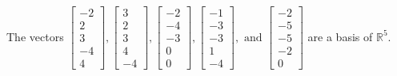 \begin{exercise}
\begin{exerciseStatement}
  \end{exerciseStatement}
  \begin{exerciseAnswer}
   The vectors \(\left[\begin{array}{r}
-2 \\
2 \\
3 \\
-4 \\
4
\end{array}\right] , \left[\begin{array}{r}
3 \\
2 \\
3 \\
4 \\
-4
\end{array}\right] , \left[\begin{array}{r}
-2 \\
-4 \\
-3 \\
0 \\
0
\end{array}\right] , \left[\begin{array}{r}
-1 \\
-3 \\
-3 \\
1 \\
-4
\end{array}\right] , \text{ and } \left[\begin{array}{r}
-2 \\
-5 \\
-5 \\
-2 \\
0
\end{array}\right]\) 
  	 are  a basis of \(\mathbb{R}^5\).
  


  \end{exerciseAnswer}
\end{exercise}